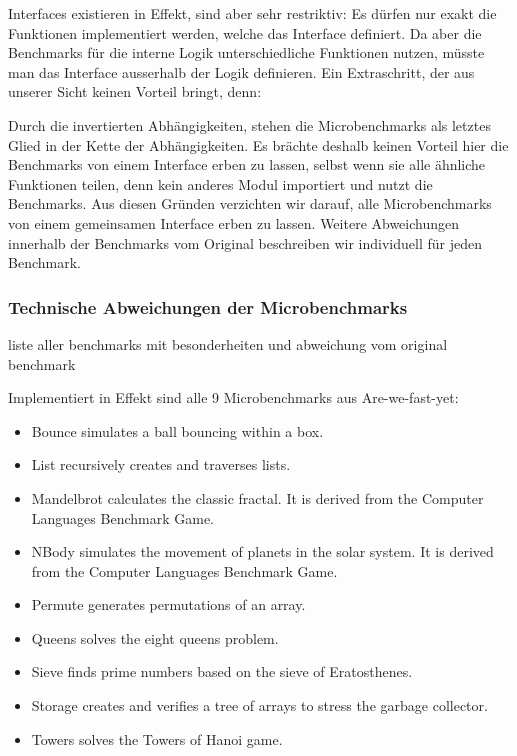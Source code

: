 Interfaces existieren in Effekt, sind aber sehr restriktiv: Es dürfen nur exakt die Funktionen implementiert werden, welche das Interface definiert. Da aber die Benchmarks für die interne Logik unterschiedliche Funktionen nutzen, müsste man das Interface ausserhalb der Logik definieren. Ein Extraschritt, der aus unserer Sicht keinen Vorteil bringt, denn:

Durch die invertierten Abhängigkeiten, stehen die Microbenchmarks als letztes Glied in der Kette der Abhängigkeiten. Es brächte deshalb keinen Vorteil hier die Benchmarks von einem Interface erben zu lassen, selbst wenn sie alle ähnliche Funktionen teilen, denn kein anderes Modul importiert und nutzt die Benchmarks. 
Aus diesen Gründen verzichten wir darauf, alle Microbenchmarks von einem gemeinsamen Interface erben zu lassen.
Weitere Abweichungen innerhalb der Benchmarks vom Original beschreiben wir individuell für jeden Benchmark.




\subsubsection{ Technische Abweichungen der Microbenchmarks }
liste aller benchmarks mit besonderheiten und abweichung vom original benchmark

Implementiert in Effekt sind alle 9 Microbenchmarks aus Are-we-fast-yet:
\begin{itemize}
\item Bounce simulates a ball bouncing within a box.
\item List recursively creates and traverses lists.
\item Mandelbrot calculates the classic fractal. It is derived from the Computer Languages Benchmark Game.
\item NBody simulates the movement of planets in the solar system. It is derived from the Computer Languages Benchmark Game.
\item Permute generates permutations of an array.
\item Queens solves the eight queens problem.
\item Sieve finds prime numbers based on the sieve of Eratosthenes.
\item Storage creates and verifies a tree of arrays to stress the garbage collector.
\item Towers solves the Towers of Hanoi game.
\end{itemize}

